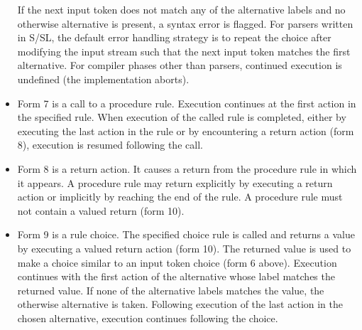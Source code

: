 \begin{itemize}
If the next input token does not match any of the  
alternative     labels  and  no  otherwise alternative is present, a
syntax error is flagged.  For parsers written in  S/SL,  the
default  error  handling  strategy  is  to repeat the choice
after modifying the input stream such that  the  next  input
token  matches  the  first alternative.  For compiler phases
other than parsers, continued execution  is  undefined  (the
implementation aborts).
\item Form 7 is a call to a procedure rule.  Execution 
continues at the first action in the specified rule.  When 
execution       of the called rule is completed, either by executing
the last action in the rule  or  by  encountering  a  return
action  (form 8), execution is resumed following the call.
\item Form 8 is a return action.         It causes a return from the
procedure  rule  in  which it appears.  A procedure rule may
return explicitly by executing a return action or implicitly
by  reaching the end of the rule.  A procedure rule must not
contain a valued return (form 10).
\item Form 9 is a rule choice.  The specified choice rule  is
called  and  returns  a  value  by executing a valued return
action (form 10).  The returned value is  used   to  make  a
choice  similar  to  an input token choice (form 6 above).
Execution continues with the first action of the alternative
whose  label  matches  the  returned  value.  If none of the
alternative labels matches the value, the otherwise 
alternative  is  taken.   Following execution of the last action in
the chosen alternative, execution  continues  following  the
choice.


\end{itemize}
